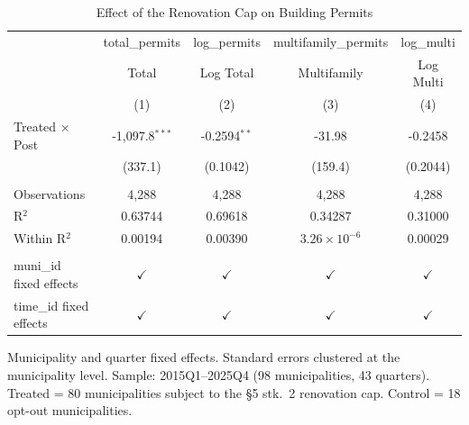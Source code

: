 
\begin{table}[htbp]
   \caption{\label{tab:main} Effect of the Renovation Cap on Building Permits}
   \bigskip
   \centering
   \begin{tabular}{lcccc}
      \toprule
                              & total\_permits   & log\_permits   & multifamily\_permits  & log\_multi\\   
                              & Total            & Log Total      & Multifamily           & Log Multi \\   
                              & (1)              & (2)            & (3)                   & (4)\\  
      \midrule 
      Treated $\times$ Post   & -1,097.8$^{***}$ & -0.2594$^{**}$ & -31.98                & -0.2458\\   
                              & (337.1)          & (0.1042)       & (159.4)               & (0.2044)\\   
       \\
      Observations            & 4,288            & 4,288          & 4,288                 & 4,288\\  
      R$^2$                   & 0.63744          & 0.69618        & 0.34287               & 0.31000\\  
      Within R$^2$            & 0.00194          & 0.00390        & $3.26\times 10^{-6}$  & 0.00029\\  
       \\
      muni\_id fixed effects  & $\checkmark$     & $\checkmark$   & $\checkmark$          & $\checkmark$\\   
      time\_id fixed effects  & $\checkmark$     & $\checkmark$   & $\checkmark$          & $\checkmark$\\   
      \bottomrule
   \end{tabular}
   
   \par \raggedright 
   Municipality and quarter fixed effects. Standard errors clustered at the municipality level. Sample: 2015Q1--2025Q4 (98 municipalities, 43 quarters). Treated = 80 municipalities subject to the \S5 stk.\ 2 renovation cap. Control = 18 opt-out municipalities.
\end{table}


